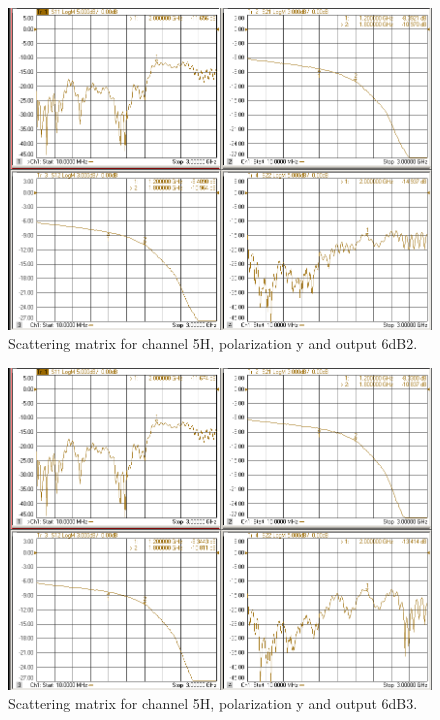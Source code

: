 \documentclass[12pt,a4paper,oneside]{article}
\begin{document}
\begin{figure}[H]
\centering
\includegraphics[width=0.9\linewidth]{VNA_results/5Hy_6dB2.png}
\caption{Scattering matrix for channel 5H, polarization y and output 6dB2.}
\label{fig:5Hy_6dB2}
\end{figure}


\begin{figure}[H]
\centering
\includegraphics[width=0.9\linewidth]{VNA_results/5Hy_6dB3.png}
\caption{Scattering matrix for channel 5H, polarization y and output 6dB3.}
\label{fig:5Hy_6dB3}
\end{figure}
\end{document}
